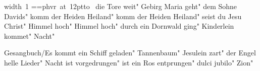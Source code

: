 \ifx\mxversion\undefined
  
  
  
  
\fi

%
\newbox\datebox%
\hbox{\pdfximage width 1\pdfrefximage\pdflastximage}
\setbox\datebox=\hbox{\font\datefont=phvr at 12pt\datefont{}\hbox to }%
\ht\datebox=0pt%
\box\datebox%
\vfill\eject
\tableofcontents
\normalmusicsize
 die Tore weit"
 Gebirg Maria geht"
 dem Sohne Davids"
 komm der Heiden Heiland"
 komm der Heiden Heiland"
 seist du Jesu Christ"
 Himmel hoch"
 Himmel hoch"
 durch ein Dornwald ging"
 Kinderlein kommet"
 Nacht"

 Gesangbuch/Es kommt ein Schiff geladen"
 Tannenbaum"
\makeatletter
{}
\makeatother
 Jesulein zart"
\makeatletter
{}
\makeatother
 der Engel helle Lieder"
 Nacht ist vorgedrungen"
 ist ein Ros entprungen"
\makeatletter
{}
\makeatother
 dulci jubilo"
\makeatletter
{}
\makeatother
 Zion"
\bookbye